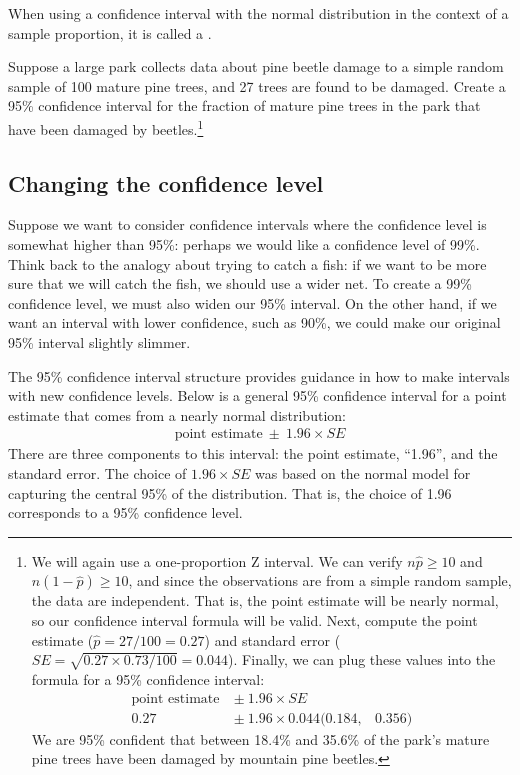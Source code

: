 When using a confidence interval with the normal distribution in the context of a sample proportion, it is called a .

\begin{exercise}\label{largeParkPineBeetleGPFor95CI}
Suppose a large park collects data about pine beetle damage to a simple random sample of 100 mature pine trees, and 27 trees are found to be damaged. Create a 95\% confidence interval for the fraction of mature pine trees in the park that have been damaged by beetles.\footnote{We will again use a one-proportion Z interval. We can verify $n\hat{p} \geq 10$ and $n(1-\hat{p}) \geq 10$, and since the observations are from a simple random sample, the data are independent. That is, the point estimate will be nearly normal, so our confidence interval formula will be valid. Next, compute the point estimate ($\hat{p} = 27 / 100 = 0.27$) and standard error ($SE = \sqrt{0.27 \times 0.73 / 100} = 0.044$). Finally, we can plug these values into the formula for a 95\% confidence interval:
\begin{align*}
\text{point estimate}\ &\pm\ 1.96\times SE \\
0.27 &\pm\ 1.96\times 0.044
(0.184,& 0.356)
\end{align*}
We are 95\% confident that between 18.4\% and 35.6\% of the park's mature pine trees have been damaged by mountain pine beetles.}
\end{exercise}


\subsection{Changing the confidence level}
\label{changingTheConfidenceLevelSection}


Suppose we want to consider confidence intervals where the confidence level is somewhat higher than 95\%: perhaps we would like a confidence level of 99\%. Think back to the analogy about trying to catch a fish: if we want to be more sure that we will catch the fish, we should use a wider net. To create a 99\% confidence level, we must also widen our 95\% interval. On the other hand, if we want an interval with lower confidence, such as 90\%, we could make our original 95\% interval slightly slimmer.

The 95\% confidence interval structure provides guidance in how to make intervals with new confidence levels. Below is a general 95\% confidence interval for a point estimate that comes from a nearly normal distribution:
\begin{eqnarray}
\text{point estimate}\ \pm\ 1.96\times SE
\end{eqnarray}
There are three components to this interval: the point estimate, ``1.96'', and the standard error. The choice of $1.96\times SE$ was based on the normal model for capturing the central 95\% of the distribution. That is, the choice of 1.96 corresponds to a 95\% confidence level.

